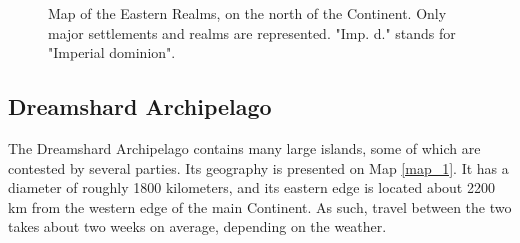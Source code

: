 \begin{figure}[ht!]
    \centering
    \caption{Map of the Eastern Realms, on the north of the Continent. Only major settlements and realms are represented. "Imp. d." stands for "Imperial dominion".}
    \label{map_2}
\end{figure}



\subsection{Dreamshard Archipelago}

The Dreamshard Archipelago contains many large islands, some of which are contested by several parties. Its geography is presented on Map \ref{map_1}. It has a diameter of roughly 1800 kilometers, and its eastern edge is located about 2200 km from the western edge of the main Continent. As such, travel between the two takes about two weeks on average, depending on the weather.

